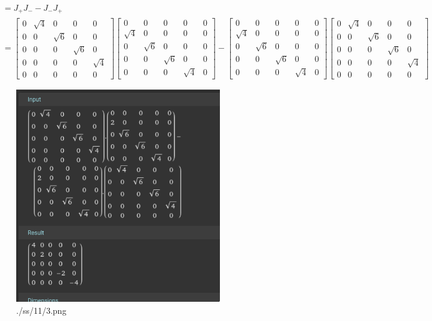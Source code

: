 \documentclass[letter, 10pts]{article}
\begin{document}
\begin{align*}
	[J_+, J_-] &= J_+ J_- - J_- J_+  \\ 
	&= 
\begin{bmatrix}
0 &  \sqrt{4} & 0 & 0 & 0 \\
0 & 0 & \sqrt{6} & 0 & 0 \\
0 & 0 & 0 & \sqrt{6} & 0 \\
0 & 0 & 0 & 0 & \sqrt{4} \\
0 & 0 & 0 & 0 & 0
\end{bmatrix}  
\begin{bmatrix}
0 & 0 & 0 & 0 & 0 \\
\sqrt{4} & 0 & 0 & 0 & 0 \\
0 & \sqrt{6} & 0 & 0 & 0 \\
0 & 0 & \sqrt{6} & 0 & 0 \\
0 & 0 & 0 & \sqrt{4} & 0
\end{bmatrix} 
- 
\begin{bmatrix}
0 & 0 & 0 & 0 & 0 \\
\sqrt{4} & 0 & 0 & 0 & 0 \\
0 & \sqrt{6} & 0 & 0 & 0 \\
0 & 0 & \sqrt{6} & 0 & 0 \\
0 & 0 & 0 & \sqrt{4} & 0
\end{bmatrix} 
\begin{bmatrix}
0 &  \sqrt{4} & 0 & 0 & 0 \\
0 & 0 & \sqrt{6} & 0 & 0 \\
0 & 0 & 0 & \sqrt{6} & 0 \\
0 & 0 & 0 & 0 & \sqrt{4} \\
0 & 0 & 0 & 0 & 0
\end{bmatrix}  
\end{align*}
\begin{figure}[H]
	\centering
	\includegraphics[width=0.8\textwidth]{./ss/11/3.png}
	\caption{./ss/11/3.png}
	\label{fig:-ss-11-3-png}
\end{figure}	
\end{document}

